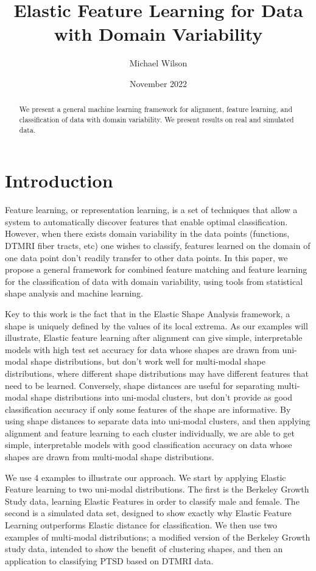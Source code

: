 \documentclass[]{article}
\title{Elastic Feature Learning for Data with Domain Variability}
\author{Michael Wilson}
\date{November 2022}
\begin{document}
\maketitle

\begin{abstract}
We present a general machine learning framework for alignment, feature learning, and classification of data with domain variability. We present results on real and simulated data.  
\end{abstract}

\section{Introduction}

Feature learning, or representation learning, is a set of techniques that allow a system to automatically discover features that enable optimal classification. However, when there exists domain variability in the data points (functions, DTMRI fiber tracts, etc) one wishes to classify, features learned on the domain of one data point don't readily transfer to other data points. In this paper, we propose a general framework for combined feature matching and feature learning for the classification of data with domain variability, using tools from statistical shape analysis and machine learning. 

Key to this work is the fact that in the Elastic Shape Analysis framework, a shape is uniquely defined by the values of its local extrema. As our examples will illustrate, Elastic feature learning after alignment can give simple, interpretable models with high test set accuracy for data whose shapes are drawn from uni-modal shape distributions, but don't work well for multi-modal shape distributions, where different shape distributions may have different features that need to be learned. Conversely, shape distances are useful for separating multi-modal shape distributions into uni-modal clusters, but don't provide as good classification accuracy if only some features of the shape are informative. By using shape distances to separate data into uni-modal clusters, and then applying alignment and feature learning to each cluster individually, we are able to get simple, interpretable models with good classification accuracy on data whose shapes are drawn from multi-modal shape distributions. 

We use 4 examples to illustrate our approach. We start by applying Elastic Feature learning to two uni-modal distributions. The first is the Berkeley Growth Study data, learning Elastic Features in order to classify male and female. The second is a simulated data set, designed to show exactly why Elastic Feature Learning outperforms Elastic distance for classification. We then use two examples of multi-modal distributions; a modified version of the Berkeley Growth study data, intended to show the benefit of clustering shapes, and then an application to classifying PTSD based on DTMRI data.
\end{document}
